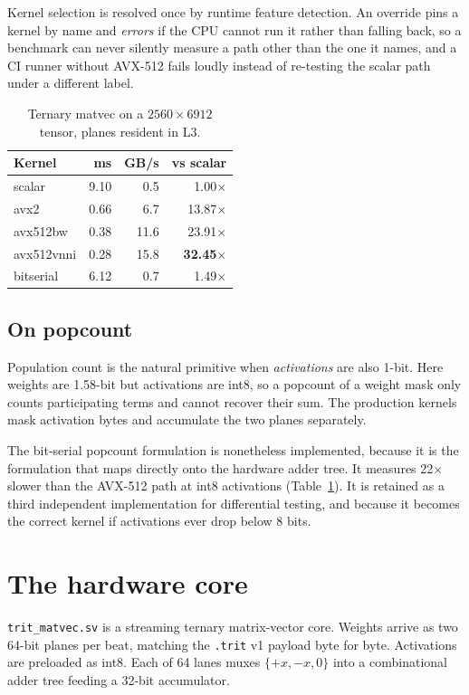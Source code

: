 \documentclass[10pt,twocolumn]{article}
\begin{document}
Kernel selection is resolved once by runtime feature detection. An override
pins a kernel by name and \emph{errors} if the CPU cannot run it rather than
falling back, so a benchmark can never silently measure a path other than the
one it names, and a CI runner without AVX-512 fails loudly instead of
re-testing the scalar path under a different label.

\begin{table}[t]
\centering
\small
\begin{tabular}{lrrr}
\toprule
Kernel & ms & GB/s & vs scalar \\
\midrule
scalar        & 9.10 & 0.5  & 1.00$\times$ \\
avx2          & 0.66 & 6.7  & 13.87$\times$ \\
avx512bw      & 0.38 & 11.6 & 23.91$\times$ \\
avx512vnni    & 0.28 & 15.8 & \textbf{32.45}$\times$ \\
bitserial     & 6.12 & 0.7  & 1.49$\times$ \\
\bottomrule
\end{tabular}
\caption{Ternary matvec on a $2560\times6912$ tensor, planes resident in L3.}
\label{tab:kernels}
\end{table}

\subsection{On popcount}

Population count is the natural primitive when \emph{activations} are also
1-bit. Here weights are 1.58-bit but activations are int8, so a popcount of a
weight mask only counts participating terms and cannot recover their sum. The
production kernels mask activation bytes and accumulate the two planes
separately.

The bit-serial popcount formulation is nonetheless implemented, because it is
the formulation that maps directly onto the hardware adder tree. It measures
22$\times$ slower than the AVX-512 path at int8 activations
(Table~\ref{tab:kernels}). It is retained as a third independent implementation
for differential testing, and because it becomes the correct kernel if
activations ever drop below 8 bits.

\section{The hardware core}
\label{sec:rtl}

\texttt{trit\_matvec.sv} is a streaming ternary matrix-vector core. Weights
arrive as two 64-bit planes per beat, matching the \texttt{.trit} v1 payload
byte for byte. Activations are preloaded as int8. Each of 64 lanes muxes
$\{+x, -x, 0\}$ into a combinational adder tree feeding a 32-bit accumulator.
\end{document}
